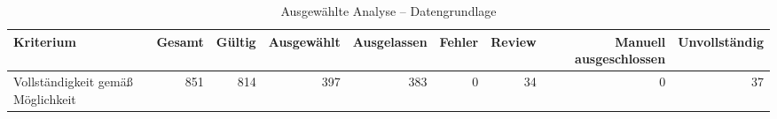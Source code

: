 \begin{table}[htbp]
\centering
\caption{Ausgewählte Analyse -- Datengrundlage}
\begin{tabular}{lrrrrrrrr}
\toprule
Kriterium & Gesamt & Gültig & Ausgewählt & Ausgelassen & Fehler & Review & Manuell ausgeschlossen & Unvollständig \\
\midrule
Vollständigkeit gemäß Möglichkeit & 851 & 814 & 397 & 383 & 0 & 34 & 0 & 37 \\
\bottomrule
\end{tabular}
\end{table}
